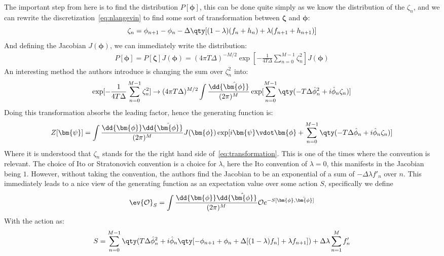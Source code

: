 \documentclass[12pt]{article}
\def\bphi{\bm{\phi}}
\def\bpsi{\bm{\psi}}
\def\bzeta{\bm{\zeta}}
\begin{document}
The important step from here is to find the distribution $P[\bphi]$, this can be done quite simply as we know the distribution of the $\zeta_n$, and we can rewrite the discretization~\eqref{eq:nlangevin} to find some sort of transformation between $\bzeta$ and $\bphi$:
\begin{equation}
  \label{eq:transformation}
  \zeta_n=\phi_{n+1}-\phi_{n}
  -\Delta\qty[(1-\lambda)(f_n+h_n)+\lambda(f_{n+1}+h_{n+1})]
\end{equation}
And defining the Jacobian $J(\bphi)$, we can immediately write the distribution:
\begin{align*}
  P[\bphi]=P[\bzeta]J(\bphi)=(4\pi T\Delta)^{-M/2}
  \exp[-\frac1{4T\Delta}\sum_{n=0}^{M-1}\zeta_n^2]J(\bphi)
\end{align*}
An interesting method the authors introduce is changing the sum over $\zeta_n^2$ into:
\begin{align*}
  \exp[-\frac1{4T\Delta}\sum_{n=0}^{M-1}\zeta_n^2]\to
  (4\pi T\Delta)^{M/2}\int\frac{\dd{\hat{\bphi}}}{(2\pi)^M}\exp[\sum_{n=0}^{M-1}
  \qty(-T\Delta\hat{\phi}^2_n+i\hat{\phi}_n\zeta_n)]
\end{align*}
Doing this transformation absorbs the leading factor, hence the generating function is:
\begin{align*}
  Z[\bpsi]=\int\frac{\dd{\bphi}\dd{\hat{\bphi}}}{(2\pi)^M}J(\bphi)
  \exp[i\bpsi\vdot\bphi+\sum_{n=0}^{M-1}\qty(-T\Delta\hat{\phi}_n
  +i\hat{\phi}_n\zeta_n)]
\end{align*}
Where it is understood that $\zeta_n$ stands for the the right hand side of~\eqref{eq:transformation}. This is one of the times where the convention is relevant. The choice of Ito or Stratonovich convention is a choice for $\lambda$, here the Ito convention of $\lambda=0$, this manifests in the Jacobian being $1$. However, without taking the convention, the authors find the Jacobian to be an exponential of a sum of $-\Delta\lambda f'_n$ over $n$. This immediately leads to a nice view of the generating function as an expectation value over some action $S$, specifically we define
\begin{equation}
  \label{eq:pathint}
  \ev{\mathcal{O}}_S=\int\frac{\dd{\bphi}\dd{\hat{\bphi}}}{(2\pi)^M}
  \mathcal{O} e^{-S[\bphi,\hat{\bphi}]}
\end{equation}
With the action as:
\begin{equation}
  \label{eq:pathaction}
  S=\sum_{n=0}^{M-1}\qty(T\Delta\hat{\phi}_n^2+i\hat{\phi}_n
  \qty[-\phi_{n+1}+\phi_n+\Delta[(1-\lambda)f_n]+\lambda f_{n+1}])
  +\Delta\lambda\sum_{n=1}^M f'_n
\end{equation}
\end{document}
